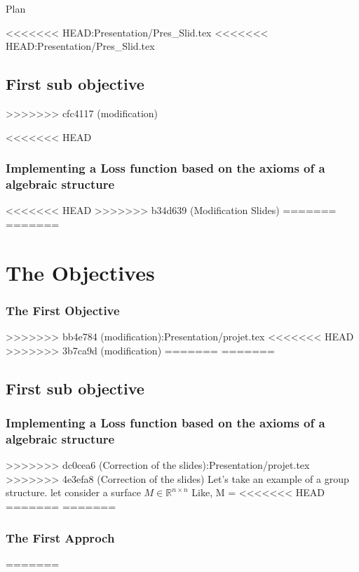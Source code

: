 \documentclass{beamer}
\begin{document}
\begin{frame}{Plan}
\begin{frame}
\begin{frame}
\begin{frame}
<<<<<<< HEAD:Presentation/Pres_Slid.tex
<<<<<<< HEAD:Presentation/Pres_Slid.tex
\subsection{First sub objective} 
>>>>>>> cfc4117 (modification)
\begin{frame}
<<<<<<< HEAD
    \frametitle{Implementing a Loss function based on the axioms of a
    algebraic structure}
<<<<<<< HEAD
>>>>>>> b34d639 (Modification Slides)
=======
=======
\section{The Objectives}
\begin{frame}
        \frametitle{The First Objective}
>>>>>>> bb4e784 (modification):Presentation/projet.tex
<<<<<<< HEAD
>>>>>>> 3b7ca9d (modification)
=======
=======
\subsection{First sub objective} 
\begin{frame}
    \frametitle{Implementing a Loss function based on the axioms of a
    algebraic structure}
>>>>>>> dc0cea6 (Correction of the slides):Presentation/projet.tex
>>>>>>> 4e3efa8 (Correction of the slides)
    Let's take an example of a group structure.
    let consider a surface $M \in \mathbb{R}^{n \times n}$
    Like,
    M =
<<<<<<< HEAD
=======
=======
        \frametitle{The First Approch}
=======


\end{frame}
\end{frame}
\end{frame}
\end{frame}
\end{frame}
\end{frame}
\end{frame}
\end{document}
